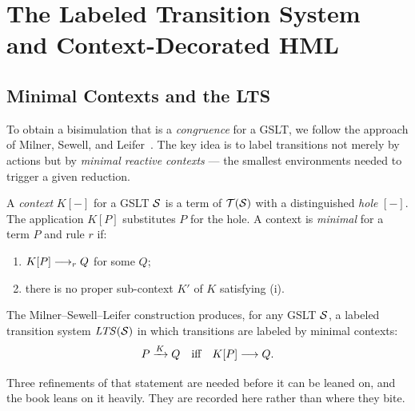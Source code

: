 \chapter{The Labeled Transition System and Context-Decorated HML}
\label{sec:lts-hml}

\section{Minimal Contexts and the LTS}

To obtain a bisimulation that is a \emph{congruence} for a GSLT, we follow
the approach of Milner, Sewell, and Leifer~\cite{leifer2000deriving}.
The key idea is to label transitions not merely by actions but by
\emph{minimal reactive contexts} --- the smallest environments needed to
trigger a given reduction.

\begin{definition}[Context]
A \emph{context} $K[-]$ for a GSLT $\mathcal{S}$ is a term of $\mathcal{T}(\mathcal{S})$
with a distinguished \emph{hole} $[-]$.  The application $K[P]$ substitutes
$P$ for the hole.  A context is \emph{minimal} for a term $P$ and rule $r$ if:
\begin{enumerate}[label=(\roman*)]
  \item $K[P] \longrightarrow_r Q$ for some $Q$;
  \item there is no proper sub-context $K'$ of $K$ satisfying (i).
\end{enumerate}
\end{definition}

The Milner--Sewell--Leifer construction produces, for any GSLT $\mathcal{S}$, a
labeled transition system $\mathit{LTS}(\mathcal{S})$ in which transitions are labeled by
minimal contexts:
\[
  P \xrightarrow{K} Q \quad\text{iff}\quad K[P] \longrightarrow Q.
\]

Three refinements of that statement are needed before it can be leaned on, and
the book leans on it heavily. They are recorded here rather than where they bite.

